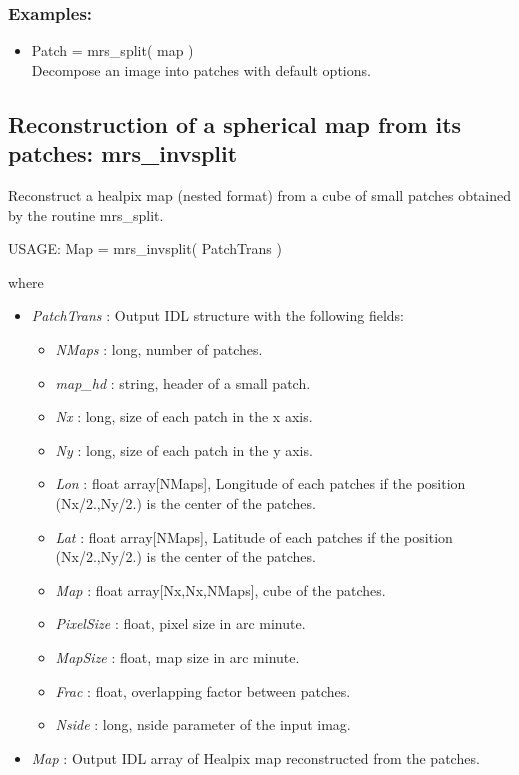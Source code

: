 \subsubsection*{Examples:} 
\begin{itemize}
\item Patch = mrs\_split( map ) \\
Decompose an image into patches with default options.
\end{itemize}



\subsection{Reconstruction of a spherical map from its patches: mrs\_invsplit}
Reconstruct a healpix map (nested format) from a cube of small patches obtained by the routine mrs\_split.
{\bf
\begin{center}
     USAGE: Map = mrs\_invsplit( PatchTrans )
\end{center}}
where
\begin{itemize}
\item {\em PatchTrans} : Output IDL structure with the following fields:
\begin{itemize}
\item {\em NMaps} : long, number of patches.
\item {\em map\_hd} : string, header of a small patch.
\item {\em Nx} : long, size of each patch in the x axis.
\item {\em Ny} : long, size of each patch in the y axis.
\item {\em Lon} : float array[NMaps], Longitude of each patches if the position (Nx/2.,Ny/2.) is the center of the patches.
\item {\em Lat} : float array[NMaps], Latitude of each patches if the position (Nx/2.,Ny/2.) is the center of the patches.
\item {\em Map} : float array[Nx,Nx,NMaps], cube of the patches.
\item {\em PixelSize} : float, pixel size in arc minute.
\item {\em MapSize} : float, map size in arc minute.
\item {\em Frac} : float, overlapping factor between patches.
\item {\em Nside} : long, nside parameter of the input imag.
\end{itemize}
\item {\em Map} : Output IDL array of Healpix map reconstructed from the patches.
\end{itemize}

